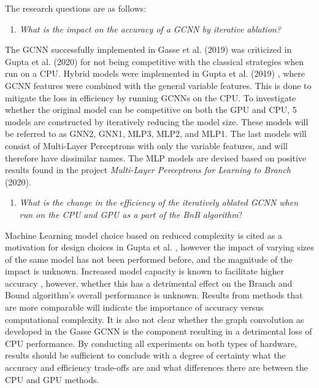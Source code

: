 The research questions are as follows:
%
\begin{enumerate}[label=(\roman*)]
    \item \textit{What is the impact on the accuracy of a \gls{GCNN} by iterative ablation?}
\end{enumerate}
%
The \gls{GCNN} successfully implemented in Gasse et al. (2019) \cite{gasse2019exact} was criticized in Gupta et al. (2020) for not being competitive with the classical strategies when run on a \gls{CPU}.
Hybrid models were implemented in Gupta et al. (2019) \cite{gupta2020hybrid}, where \Gls{GCNN} features were combined with the general variable features. This is done to mitigate the loss in efficiency by running \gls{GCNN}s on the \gls{CPU}. To investigate whether the original model can be competitive on both the \gls{GPU} and \gls{CPU}, 5 models are constructed by iteratively reducing the model size. These models will be referred to as GNN2, GNN1, MLP3, MLP2, and MLP1. The last models will consist of Multi-Layer Perceptrons with only the variable features, and will therefore have dissimilar names. The \gls{MLP} models are devised based on positive results found in the project \textit{Multi-Layer Perceptrons for Learning to Branch
} (2020).
%
\begin{enumerate}[resume*]
    \item \textit{What is the change in the efficiency of the iteratively ablated \gls{GCNN} when run on the \gls{CPU} and \gls{GPU} as a part of the \gls{BnB} algorithm}?
\end{enumerate}
%
Machine Learning model choice based on reduced complexity is cited as a motivation for design choices in Gupta et al. \cite{gupta2020hybrid}, however the impact of varying sizes of the same model has not been performed before, and the magnitude of the impact is unknown. Increased model capacity is known to facilitate higher accuracy \cite{goodfellow2016deep}, however, whether this has a detrimental effect on the Branch and Bound algorithm's overall performance is unknown. Results from methods that are more comparable will indicate the importance of accuracy versus computational complexity. It is also not clear whether the graph convolution as developed in the Gasse \gls{GCNN} is the component resulting in a detrimental loss of \gls{CPU} performance. By conducting all experiments on both types of hardware, results should be sufficient to conclude with a degree of certainty what the accuracy and efficiency trade-offs are and what differences there are between the \gls{CPU} and \gls{GPU} methods. 
